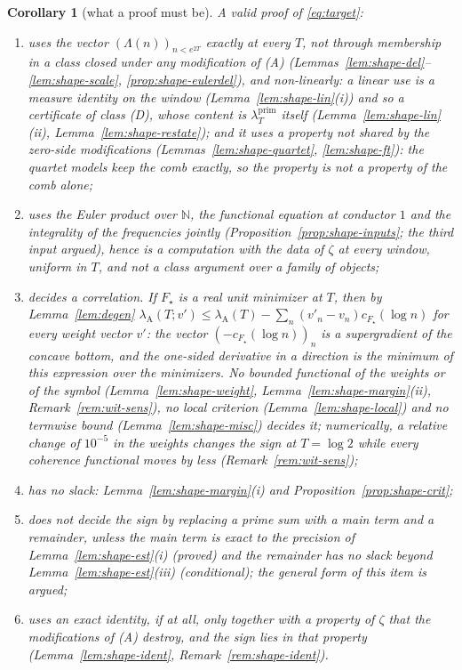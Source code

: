\documentclass[11pt]{amsart}
\newtheorem{corollary}[theorem]{Corollary}
\theoremstyle{definition}
\theoremstyle{remark}
\newcommand{\N}{\mathbb N}
\newcommand{\lamP}{\lambda^{\mathrm{prim}}_T}
\newcommand{\lamA}{\lambda_{\mathrm A}(T)}
\begin{document}
\begin{corollary}[what a proof must be]\label{cor:shape}
A valid proof of \eqref{eq:target}:
\begin{enumerate}
\item[(a)] uses the vector $(\Lambda(n))_{n<e^{2T}}$ exactly at every $T$, not through membership in a class closed under any modification
of (A) (Lemmas~\ref{lem:shape-del}--\ref{lem:shape-scale}, \ref{prop:shape-eulerdel}), and non-linearly: a linear use is a measure identity
on the window (Lemma~\ref{lem:shape-lin}(i)) and so a certificate of class (D), whose content is $\lamP$ itself
(Lemma~\ref{lem:shape-lin}(ii), Lemma~\ref{lem:shape-restate}); and it uses a property not shared by the zero-side modifications
(Lemmas~\ref{lem:shape-quartet}, \ref{lem:shape-ft}): the quartet models keep the comb exactly, so the property is not a property of the
comb alone;
\item[(b)] uses the Euler product over $\N$, the functional equation at conductor $1$ and the integrality of the frequencies jointly
(Proposition~\ref{prop:shape-inputs}; the third input argued), hence is a computation with the data of $\zeta$ at every window, uniform in
$T$, and not a class argument over a family of objects;
\item[(c)] decides a correlation. If $F_\star$ is a real unit minimizer at $T$, then by Lemma~\ref{lem:degen}
$\lambda_{\mathrm A}(T;v')\le\lamA-\sum_n(v'_n-v_n)c_{F_\star}(\log n)$ for every weight vector $v'$: the vector
$(-c_{F_\star}(\log n))_n$ is a supergradient of the concave bottom, and the one-sided derivative in a direction is the minimum of this
expression over the minimizers. No bounded functional of the weights or of the symbol (Lemma~\ref{lem:shape-weight},
Lemma~\ref{lem:shape-margin}(ii), Remark~\ref{rem:wit-sens}), no local criterion (Lemma~\ref{lem:shape-local}) and no termwise bound
(Lemma~\ref{lem:shape-misc}) decides it; numerically, a relative change of $10^{-5}$ in the weights changes the sign at $T=\log2$ while
every coherence functional moves by less (Remark~\ref{rem:wit-sens});
\item[(d)] has no slack: Lemma~\ref{lem:shape-margin}(i) and Proposition~\ref{prop:shape-crit};
\item[(e)] does not decide the sign by replacing a prime sum with a main term and a remainder, unless the main term is exact to the
precision of Lemma~\ref{lem:shape-est}(i) (proved) and the remainder has no slack beyond Lemma~\ref{lem:shape-est}(iii) (conditional);
the general form of this item is argued;
\item[(f)] uses an exact identity, if at all, only together with a property of $\zeta$ that the modifications of (A) destroy, and the sign
lies in that property (Lemma~\ref{lem:shape-ident}, Remark~\ref{rem:shape-ident}).
\end{enumerate}
\end{corollary}
\end{document}
